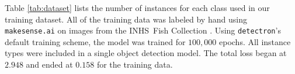\documentclass[screen,review]{acmart}
\begin{document}
Table \ref{tab:dataset} lists the number of instances for each class 
used in our training dataset.
All of the training data was labeled by hand using \verb|makesense.ai| \cite{make-sense}
on images from the INHS\ Fish Collection \cite{INHS}.
Using \verb|detectron|'s default training scheme, the model was trained for \(100,000\) epochs. All instance types were included in a single object detection model. The total loss began at \(2.948\) and ended at \(0.158\) for the training data.

\end{document}
